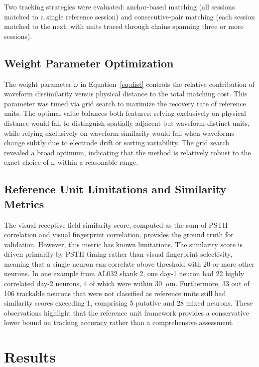 \documentclass[12pt]{article}
\begin{document}
Two tracking strategies were evaluated: anchor-based matching (all sessions matched to a single reference session) and consecutive-pair matching (each session matched to the next, with units traced through chains spanning three or more sessions).

\subsection{Weight Parameter Optimization}

The weight parameter $\omega$ in Equation~\ref{eq:dist} controls the relative contribution of waveform dissimilarity versus physical distance to the total matching cost. This parameter was tuned via grid search to maximize the recovery rate of reference units. The optimal value balances both features: relying exclusively on physical distance would fail to distinguish spatially adjacent but waveform-distinct units, while relying exclusively on waveform similarity would fail when waveforms change subtly due to electrode drift or sorting variability. The grid search revealed a broad optimum, indicating that the method is relatively robust to the exact choice of $\omega$ within a reasonable range.

\subsection{Reference Unit Limitations and Similarity Metrics}

The visual receptive field similarity score, computed as the sum of PSTH correlation and visual fingerprint correlation, provides the ground truth for validation. However, this metric has known limitations. The similarity score is driven primarily by PSTH timing rather than visual fingerprint selectivity, meaning that a single neuron can correlate above threshold with 20 or more other neurons. In one example from AL032 shank 2, one day-1 neuron had 22 highly correlated day-2 neurons, 4 of which were within 30~$\mu$m. Furthermore, 33 out of 106 trackable neurons that were not classified as reference units still had similarity scores exceeding 1, comprising 5 putative and 28 mixed neurons. These observations highlight that the reference unit framework provides a conservative lower bound on tracking accuracy rather than a comprehensive assessment.

\section{Results}
\end{document}
